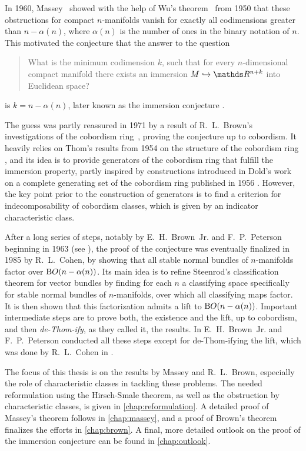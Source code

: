 In 1960, Massey~\cite{massey} showed with the help of Wu's
theorem~\cite{wu} from 1950 that these obstructions for compact
$n$-manifolds vanish for exactly all codimensions greater than
$n-\alpha(n)$, where $\alpha(n)$ is the number of ones in the binary
notation of $n$.
This motivated the conjecture that the answer to the question
\begin{quote}
    What is the minimum codimension $k$, such that for every
    $n$-dimensional compact manifold there exists an
    immersion $M\immto\R^{n+k}$ into Euclidean space?
\end{quote}
is $k=n-\alpha(n)$, later known as the immersion conjecture
\cite{cohen}.

The guess was partly reassured in 1971 by a result of R.~L.~Brown's
investigations of the cobordism ring~\cite{brown}, proving the
conjecture up to cobordism. It heavily relies on Thom's results from
1954 on the structure of the cobordism ring \cite{thomfrench},
and its idea is to provide generators of the
cobordism ring that fulfill the immersion property, partly inspired by
constructions introduced in Dold's work on a complete generating set
of the cobordism ring published in 1956 \cite{dold}.
However, the key point prior to the construction of generators is to
find a criterion for indecomposability of cobordism classes, which is
given by an indicator characteristic class.

After a long series of steps, notably by E.~H.~Brown~Jr. and
F.~P.~Peterson beginning in 1963 (see \cite{cohen}), the proof of the
conjecture was eventually finalized in 1985 by R.~L.~Cohen, by showing
that all stable normal bundles of $n$-manifolds factor over
$\mathrm{B}O(n-\alpha(n))$.
Its main idea is to refine Steenrod's classification theorem for
vector bundles by finding for each $n$ a classifying space specifically
for stable normal bundles of $n$-manifolds, over which all classifying
maps factor. It is then shown that this factorization admits a lift to
$\mathrm{B}O(n-\alpha(n))$.
Important intermediate steps are to prove both, the existence and the
lift, up to cobordism, and then \emph{de-Thom-ify}, as they called it,
the results.
In \cite{brownpeterson} E.~H.~Brown~Jr. and F.~P.~Peterson conducted
all these steps except for de-Thom-ifying the lift,
which was done by R.~L.~Cohen in \cite{cohen}.

The focus of this thesis is on the results by Massey and
R.~L.~Brown, especially the role of characteristic classes in tackling
these problems.
The needed reformulation using the Hirsch-Smale theorem, as well as
the obstruction by characteristic classes, is given in
\autoref{chap:reformulation}.
A detailed proof of Massey's theorem follows in \autoref{chap:massey},
and a proof of Brown's theorem finalizes the efforts in
\autoref{chap:brown}.
A final, more detailed outlook on the proof of the immersion
conjecture can be found in \autoref{chap:outlook}.

